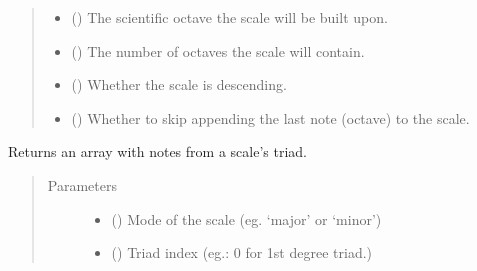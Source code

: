 \documentclass[letterpaper,10pt,english]{sphinxmanual}
\begin{document}
\begin{fulllineitems}
\begin{fulllineitems}
\begin{quote}
\begin{description}
\begin{itemize}
\item {} 
\sphinxAtStartPar
{} () \textendash{} The scientific octave the scale will be built upon.

\item {} 
\sphinxAtStartPar
{} () \textendash{} The number of octaves the scale will contain.

\item {} 
\sphinxAtStartPar
{} () \textendash{} Whether the scale is descending.

\item {} 
\sphinxAtStartPar
{} () \textendash{} Whether to skip appending the last
note (octave) to the scale.

\end{itemize}

\end{description}\end{quote}

\end{fulllineitems}


\begin{fulllineitems}
\label{\detokenize{birdears:birdears.scale.ChromaticScale.get_triad}}
\sphinxAtStartPar
Returns an array with notes from a scale’s triad.
\begin{quote}\begin{description}
\item[{Parameters}] \leavevmode\begin{itemize}
\item {} 
\sphinxAtStartPar
{} () \textendash{} Mode of the scale (eg. ‘major’ or ‘minor’)

\item {} 
\sphinxAtStartPar
{} () \textendash{} Triad index (eg.: 0 for 1st degree triad.)


\end{itemize}
\end{description}
\end{quote}
\end{fulllineitems}
\end{fulllineitems}
\end{document}
